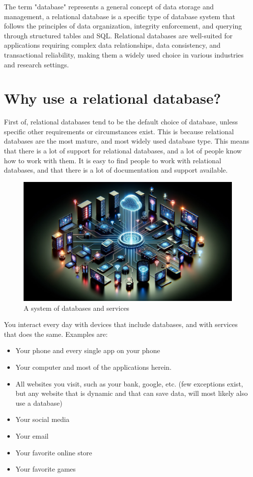 The term "database" represents a general concept of data storage and management, a relational database is a specific type of database system that follows the principles of data organization, integrity enforcement, and querying through structured tables and SQL. Relational databases are well-suited for applications requiring complex data relationships, data consistency, and transactional reliability, making them a widely used choice in various industries and research settings.

\section{Why use a relational database?}
First of, relational databases tend to be the default choice of database, unless specific other requirements or circumstances exist. This is because relational databases are the most mature, and most widely used database type. This means that there is a lot of support for relational databases, and a lot of people know how to work with them. It is easy to find people to work with relational databases, and that there is a lot of documentation and support available.

\begin{figure}[htbp]
    \centering
    \includegraphics[width=1\textwidth]{content/1-relational-databases/figures/i1-databases-everywhere.png}
    \caption{A system of databases and services}
    \label{fig:0.i1-databases-everywhere.png}
\end{figure}

You interact every day with devices that include databases, and with services that does the same. Examples are:

\begin{itemize}
    \item Your phone and every single app on your phone
    \item Your computer and most of the applications herein.
    \item All websites you visit, such as your bank, google, etc. (few exceptions exist, but any website that is dynamic and that can save data, will most likely also use a database)
    \item Your social media
    \item Your email
    \item Your favorite online store
    \item Your favorite games
\end{itemize}

